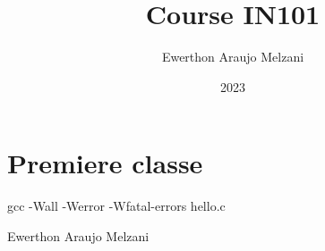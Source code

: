\documentclass{article}
\title{Course IN101}
\author{Ewerthon Araujo Melzani}
\date{2023}
\begin{document}
\maketitle

\section*{Premiere classe}

\vspace*{1.5 cm}

gcc -Wall -Werror -Wfatal-errors hello.c

\vspace*{1.5 cm}



\LARGE Ewerthon Araujo Melzani
\end{document}
